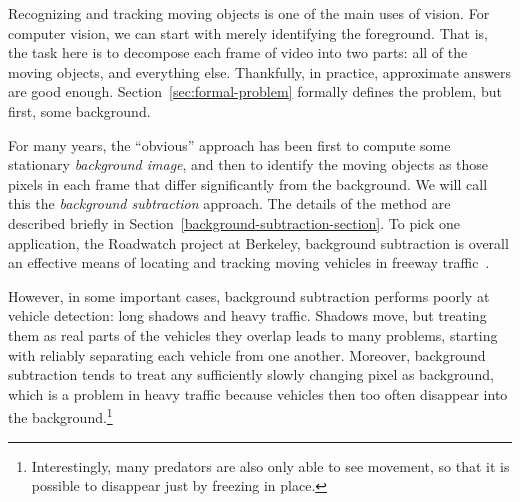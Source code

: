 \newcommand{\secref}[1]{Section~\ref{#1}}
\newcommand{\figref}[1]{Figure~\ref{#1}}
\newcommand{\tabref}[1]{Table~\ref{#1}}
\newcommand{\eqref}[1]{Equation~(\ref{#1})}

\newcommand{\mbf}[1]{\mbox{{\bf #1}}}
\newcommand{\smbf}[1]{\mbox{{\scriptsize\bf #1}}}
\def\w{\mbf{w}}


Recognizing and tracking moving
objects is one of the main uses of vision.
For computer vision, we can start with merely identifying the
foreground.
That is, the task here is to decompose 
each frame of video into two parts: all of the moving objects, and
everything else.  Thankfully, in practice, approximate answers are
good enough.  \secref{sec:formal-problem} formally defines the problem,
but first, some background. 

For many years, the ``obvious'' approach has
been first to compute some stationary {\em background image}, and then to
identify the moving objects as those pixels in each frame that
differ significantly from the background. We will call this the
{\em background subtraction} approach. 
The details of the method are described briefly in
\secref{background-subtraction-section}.
To pick one application, the Roadwatch project at Berkeley,
background subtraction is overall an effective means of
locating and tracking moving vehicles in freeway
traffic~\cite{Koller+al:1994}.

However, in some important cases, background subtraction performs
poorly at vehicle detection: long shadows and heavy traffic. 
Shadows move, but treating them as real parts of the vehicles they
overlap leads to many problems, starting with reliably separating each
vehicle from one another.
Moreover, background subtraction tends to treat any
sufficiently slowly changing pixel as 
background, which is a problem in heavy traffic because vehicles
then too often disappear into the background.\footnote{Interestingly,
  many predators are also only able to see movement, so that
  it is possible to disappear just by freezing in place.}


